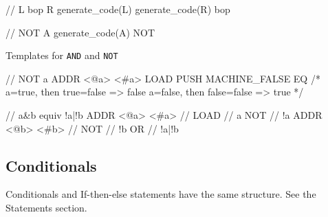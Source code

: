 \begin{code}
// L bop R 
generate_code(L)
generate_code(R)
bop

// NOT A
generate_code(A)
NOT
\end{code}

Templates for \texttt{AND} and \texttt{NOT}

\begin{code}[NOT]
// NOT a
ADDR <@a> <#a>
LOAD
PUSH MACHINE_FALSE
EQ 
/* 
  a=true, then true=false => false
  a=false, then false=false => true
*/
\end{code}

\begin{code}[AND]
// a&b equiv !a|!b
ADDR <@a> <#a> // 
LOAD           // a 
NOT            // !a
ADDR <@b> <#b> //
NOT            // !b
OR             // !a|!b
\end{code}
\subsection{Conditionals}
Conditionals and If-then-else statements have the same structure. See the
Statements section.
